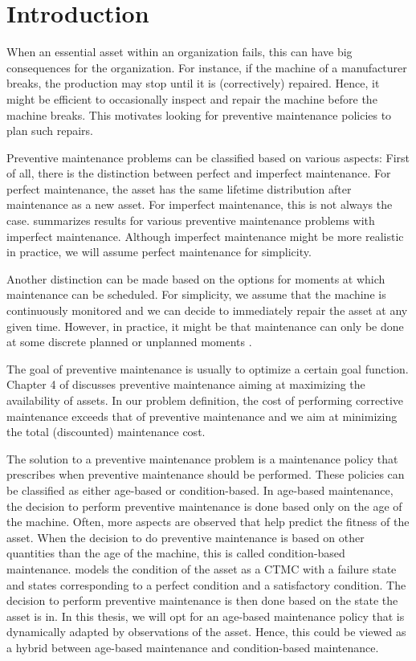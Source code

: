 \chapter{Introduction}\label{chapter:Introduction}
When an essential asset within an organization fails, this can have big consequences for the organization.
For instance, if the machine of a manufacturer breaks, the production may stop until it is (correctively) repaired.
Hence, it might be efficient to occasionally inspect and repair the machine before the machine breaks.
This motivates looking for preventive maintenance policies to plan such repairs.

Preventive maintenance problems can be classified based on various aspects:
First of all, there is the distinction between perfect and imperfect maintenance.
For perfect maintenance, the asset has the same lifetime distribution after maintenance as a new asset.
For imperfect maintenance, this is not always the case.
\cite{Pham1996} summarizes results for various preventive maintenance problems with imperfect maintenance.
Although imperfect maintenance might be more realistic in practice, we will assume perfect maintenance for simplicity.

Another distinction can be made based on the options for moments at which maintenance can be scheduled.
For simplicity, we assume that the machine is continuously monitored and we can decide to immediately repair the asset at any given time.
However, in practice, it might be that maintenance can only be done at some discrete planned or unplanned moments \cite{Kalosi2016}.

The goal of preventive maintenance is usually to optimize a certain goal function.
Chapter 4 of \cite{Zacks2012} discusses preventive maintenance aiming at maximizing the availability of assets.
In our problem definition, the cost of performing corrective maintenance exceeds that of preventive maintenance and we aim at minimizing the total (discounted) maintenance cost.

The solution to a preventive maintenance problem is a maintenance policy that prescribes when preventive maintenance should be performed.
These policies can be classified as either age-based or condition-based.
In age-based maintenance, the decision to perform preventive maintenance is done based only on the age of the machine.
Often, more aspects are observed that help predict the fitness of the asset.
When the decision to do preventive maintenance is based on other quantities than the age of the machine, this is called condition-based maintenance.
\cite{Kalosi2016} models the condition of the asset as a CTMC with a failure state and states corresponding to a perfect condition and a satisfactory condition.
The decision to perform preventive maintenance is then done based on the state the asset is in.
In this thesis, we will opt for an age-based maintenance policy that is dynamically adapted by observations of the asset.
Hence, this could be viewed as a hybrid between age-based maintenance and condition-based maintenance.

